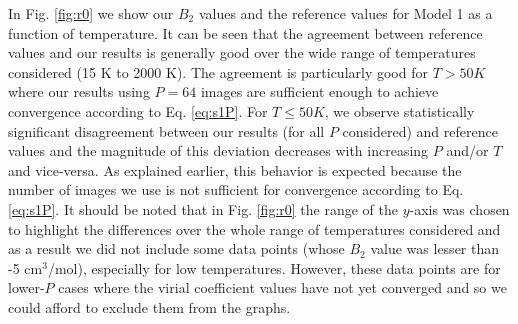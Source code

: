                 In Fig. \ref{fig:r0} we show our $B_2$ values and the reference values for Model 1 as a function of temperature. It can be seen that the agreement between reference values and our results is generally good over the wide range of temperatures considered (15 K to 2000 K). The agreement is particularly good for $T > 50 K$ where our results using $P = 64$ images are sufficient enough to achieve convergence according to Eq. \eqref{eq:s1P}. For $T \le 50 K$, we observe statistically significant disagreement between our results (for all $P$ considered) and reference values and the magnitude of this deviation decreases with increasing $P$ and/or $T$ and vice-versa. As explained earlier, this behavior is expected because the number of images we use is not sufficient for convergence according to Eq. \eqref{eq:s1P}. It should be noted that in Fig. \ref{fig:r0} the range of the $y$-axis was chosen to highlight the differences over the whole range of temperatures considered and as a result we did not include some data points (whose $B_2$ value was lesser than -5 cm$^3$/mol), especially for low temperatures. However, these data points are for lower-$P$ cases where the virial coefficient values have not yet converged and so we could afford to exclude them from the graphs.

